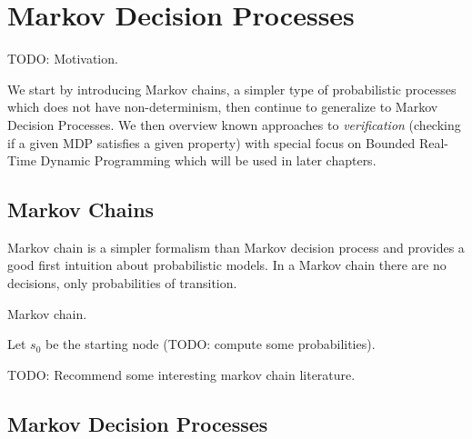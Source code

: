 \chapter{Markov Decision Processes}
\label{ch_mdp}

TODO: Motivation.

We start by introducing Markov chains, a simpler type of probabilistic
processes which does not have non-determinism,
then continue to generalize to Markov Decision Processes.
We then overview known approaches to {\em verification} (checking if a
given MDP satisfies a given property) with special focus on Bounded
Real-Time Dynamic Programming which will be used in later chapters.

\section{Markov Chains}

Markov chain is a simpler formalism than
Markov decision process and provides a good first intuition about
probabilistic models. In a Markov chain there are no decisions, only
probabilities of transition.

\begin{definition}
    Markov chain.
\end{definition}

\begin{example}
    Let $s_0$ be the starting node (TODO: compute some
    probabilities).

\hfill \break
\centering
{}
\end{example}

TODO: Recommend some interesting markov chain literature.

\section{Markov Decision Processes}

